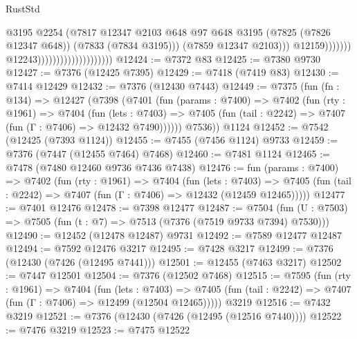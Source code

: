 \begin{lexlean}{RustStd}
\begin{coremodule}
                                                              @3195
                                                              @2254
                                                              (@7817
                                                                @12347
                                                                @2103
                                                                @648
                                                                @97
                                                                @648
                                                                @3195
                                                                (@7825 (@7826 @12347 @648))
                                                                (@7833 (@7834 @3195)))
                                                              (@7859 @12347 @2103)))
                                                          @12159)))))))
                                            @12243))))))))))))))))))))
@12424 := @7372 @83
@12425 := @7380 @9730
@12427 := @7376 (@12425 @7395)
@12429 := @7418 (@7419 @83)
@12430 := @7414 @12429
@12432 := @7376 (@12430 @7443)
@12449 := @7375
    (fun (fn : @134) =>
    @12427
      (@7398
        (@7401
          (fun (params : @7400) =>
          @7402
            (fun (rty : @1961) =>
            @7404
              (fun (lets : @7403) =>
              @7405 (fun (tail : @2242) => @7407 (fun (Γ : @7406) => @12432 @7490))))))
        @7536))
    @1124
@12452 := @7542 (@12425 (@7393 @1124))
@12455 := @7455 (@7456 @1124) @9733
@12459 := @7376 (@7447 (@12455 @7464) @7468)
@12460 := @7481 @1124
@12465 := @7478 (@7480 @12460 @9736 @7436 @7438)
@12476 := fun (params : @7400) =>
  @7402
    (fun (rty : @1961) =>
    @7404
      (fun (lets : @7403) =>
      @7405 (fun (tail : @2242) => @7407 (fun (Γ : @7406) => @12432 (@12459 @12465)))))
@12477 := @7401 @12476
@12478 := @7398 @12477
@12487 := @7504 (fun (U : @7503) => @7505 (fun (t : @7) => @7513 (@7376 (@7519 @9733 @7394) @7530)))
@12490 := @12452 (@12478 @12487) @9731
@12492 := @7589 @12477 @12487
@12494 := @7592 @12476 @3217
@12495 := @7428 @3217
@12499 := @7376 (@12430 (@7426 (@12495 @7441)))
@12501 := @12455 (@7463 @3217)
@12502 := @7447 @12501
@12504 := @7376 (@12502 @7468)
@12515 := @7595
    (fun (rty : @1961) =>
    @7404
      (fun (lets : @7403) =>
      @7405 (fun (tail : @2242) => @7407 (fun (Γ : @7406) => @12499 (@12504 @12465)))))
    @3219
@12516 := @7432 @3219
@12521 := @7376 (@12430 (@7426 (@12495 (@12516 @7440))))
@12522 := @7476 @3219
@12523 := @7475 @12522

\end{coremodule}
\end{lexlean}
